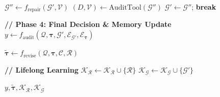 \begin{algorithm}[t]
\begin{algorithmic}[1]
        \State $\mathcal{G}'' \gets f_{\mathrm{repair}}(\mathcal{G}', \mathcal{V})$
        \State $(D, \mathcal{V}) \gets \text{AuditTool}(\mathcal{G}'')$
            \State $\mathcal{G}' \gets \mathcal{G}''$; \textbf{break}
        \EndIf
    \EndFor
\EndIf

\State \textbf{// Phase 4: Final Decision \& Memory Update}
\State $y \gets f_{\mathrm{audit}}(\mathcal{Q}, \boldsymbol{\tau}, \mathcal{G}', \mathcal{E}_{\mathcal{G}'}, \mathcal{E}_{\boldsymbol{\tau}})$ 

    \State $\tilde{\boldsymbol{\tau}} \gets f_{\mathrm{revise}}(\mathcal{Q}, \boldsymbol{\tau}, \mathcal{C}, \mathcal{R})$ 
\EndIf

\State \textbf{// Lifelong Learning}
    \State $\mathcal{K_R} \gets \mathcal{K_R} \cup \{ \mathcal{R} \}$
\EndIf
{}
    \State $\mathcal{K_G} \gets \mathcal{K_G} \cup \{ \mathcal{G}' \}$ 
\EndIf

\Return $y, \tilde{\boldsymbol{\tau}}, \mathcal{K_R}, \mathcal{K_G}$
\end{algorithmic}
\end{algorithm}